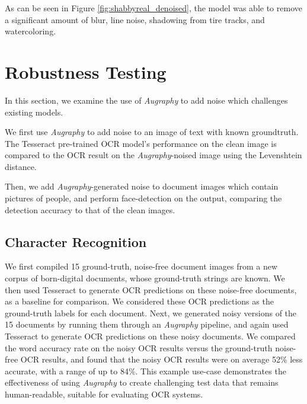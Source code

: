 \documentclass[runningheads]{llncs}
\begin{document}
As can be seen in Figure \ref{fig:shabbyreal_denoised}, the model was able to remove a significant amount of blur, line noise, shadowing from tire tracks, and watercoloring.

\section{Robustness Testing}
In this section, we examine the use of \emph{Augraphy} to add noise which challenges existing models.

We first use \emph{Augraphy} to add noise to an image of text with known groundtruth.
The Tesseract \cite{ref_tesseract} pre-trained OCR model's performance on the clean image is compared to the OCR result on the \emph{Augraphy}-noised image using the Levenshtein distance.

Then, we add \emph{Augraphy}-generated noise to document images which contain pictures of people, and perform face-detection on the output, comparing the detection accuracy to that of the clean images.

\subsection{Character Recognition}
We first compiled 15 ground-truth, noise-free document images from a new corpus of born-digital documents, whose ground-truth strings are known. We then used Tesseract to generate OCR predictions on these noise-free documents, as a baseline for comparison. We considered these OCR predictions as the ground-truth labels for each document. Next, we generated noisy versions of the 15 documents by running them through an \emph{Augraphy} pipeline, and again used Tesseract to generate OCR predictions on these noisy documents. We compared the word accuracy rate on the noisy OCR results versus the ground-truth noise-free OCR results, and found that the noisy OCR results were on average 52\% less accurate, with a range of up to 84\%. This example use-case demonstrates the effectiveness of using \emph{Augraphy} to create challenging test data that remains human-readable, suitable for evaluating OCR systems.
\end{document}
